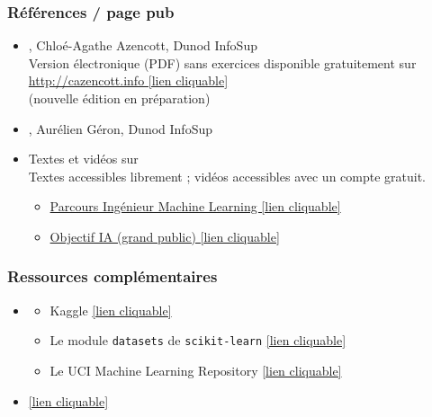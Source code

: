 \begin{frame}
  \frametitle{Références / page pub}
  \begin{itemize}
  \item {}, Chloé-Agathe Azencott, Dunod InfoSup \\
    Version électronique (PDF) sans exercices disponible gratuitement sur  \textcolor{MyBlue}{\href{http://cazencott.info/dotclear/public/lectures/IntroML_Azencott.pdf}{http://cazencott.info [lien cliquable]}}\\
    (nouvelle édition en préparation)
  \item {}, Aurélien Géron, Dunod
    InfoSup
  \item Textes et vidéos sur  \\
    {\footnotesize Textes accessibles librement ; vidéos accessibles avec un compte gratuit.}
    \begin{itemize} 
    \item \textcolor{MyBlue}{\href{https://openclassrooms.com/fr/paths/148-ingenieur-machine-learning\#path-tabs}{Parcours Ingénieur Machine Learning [lien cliquable]}}
     \item \textcolor{MyBlue}{\href{https://openclassrooms.com/fr/courses/6417031-objectif-ia-initiez-vous-a-lintelligence-artificielle}{Objectif IA (grand public)  [lien cliquable]}}
    \end{itemize}
  \end{itemize}
\end{frame}

\begin{frame}
  \frametitle{Ressources complémentaires}
  \begin{itemize}
  \item {}
    \begin{itemize}
    \item Kaggle \href{https://www.kaggle.com/}{[lien cliquable]}
    \item Le module \texttt{datasets} de \texttt{scikit-learn} \textcolor{MyBlue}{\href{https://sklearn.org/datasets/index.html}{[lien cliquable]}}
    \item Le UCI Machine Learning Repository \textcolor{MyBlue}{\href{https://archive.ics.uci.edu/ml/index.php}{[lien cliquable]}}
    \end{itemize}
  \item {} \textcolor{MyBlue}{\href{https://inria.github.io/scikit-learn-mooc/}{[lien cliquable]}}
  \end{itemize}
\end{frame}

